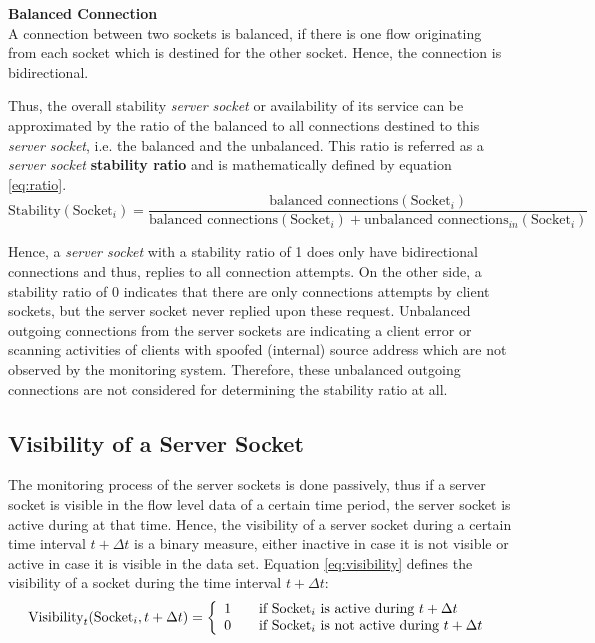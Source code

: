 \parbox{ 
\textwidth}{ 
\begin{defn}
	{\textbf{Balanced Connection}\\} A connection between two sockets is balanced, if there is one flow originating from each socket which is destined for the other socket. Hence, the connection is bidirectional. 
\end{defn}
}

Thus, the overall stability \emph{server socket} or availability of its service can be approximated by the ratio of the balanced to all connections destined to this \emph{server socket}, i.e. the balanced and the unbalanced. This ratio is referred as a \emph{server socket} \textbf{stability ratio} and is mathematically defined by equation \ref{eq:ratio}. 
\begin{equation}
	\text{Stability}(\text{Socket}_i) = \frac{\text{balanced connections}(\text{Socket}_i)}{\text{balanced connections}(\text{Socket}_i) + \text{unbalanced connections}_{in}(\text{Socket}_i)} 
	\label{eq:ratio} 
\end{equation}

Hence, a \emph{server socket} with a stability ratio of 1 does only have bidirectional connections and thus, replies to all connection attempts. On the other side, a stability ratio of 0 indicates that there are only connections attempts by client sockets, but the server socket never replied upon these request. Unbalanced outgoing connections from the server sockets are indicating a client error or scanning activities of clients with spoofed (internal) source address which are not observed by the monitoring system. Therefore, these unbalanced outgoing connections are not considered for determining the stability ratio at all.

\subsection{Visibility of a Server Socket}

The monitoring process of the server sockets is done passively, thus if a server socket is visible in the flow level data of a certain time period, the server socket is active during at that time. Hence, the visibility of a server socket during a certain time interval $t+\Delta{t}$ is a binary measure, either inactive in case it is not visible or active in case it is visible in the data set. Equation \ref{eq:visibility} defines the visibility of a socket during the time interval $t+\Delta{t}$: 
\begin{equation}
	\text{Visibility}_t(\text{Socket}_i,t+\Delta{t}) = \left\{ 
	\begin{array}{l l}
		1 & \quad \text{if $\text{Socket}_i$ is active during $t+\Delta{t}$}\\
		0 & \quad \text{if $\text{Socket}_i$ is not active during $t+\Delta{t}$}\\
	\end{array}
	\right. 
	\label{eq:visibility} 
\end{equation}


